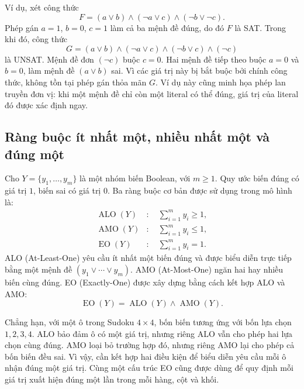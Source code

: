 \documentclass[a4paper,fleqn]{cas-sc}
\begin{document}
Ví dụ, xét công thức
\begin{equation}
 F=(a\lor b)\land(\neg a\lor c)\land(\neg b\lor\neg c).
 \label{eq:theory-sat-example}
\end{equation}
Phép gán $a=1$, $b=0$, $c=1$ làm cả ba mệnh đề đúng, do đó $F$ là SAT.
Trong khi đó, công thức
\begin{equation}
 G=(a\lor b)\land(\neg a\lor c)
   \land(\neg b\lor c)\land(\neg c)
 \label{eq:theory-unsat-example}
\end{equation}
là UNSAT. Mệnh đề đơn $(\neg c)$ buộc $c=0$. Hai mệnh đề tiếp theo
buộc $a=0$ và $b=0$, làm mệnh đề $(a\lor b)$ sai. Vì các giá trị này bị
bắt buộc bởi chính công thức, không tồn tại phép gán thỏa mãn $G$.
Ví dụ này cũng minh họa phép lan truyền đơn vị: khi một mệnh đề chỉ còn
một literal có thể đúng, giá trị của literal đó được xác định ngay.

\subsection{Ràng buộc ít nhất một, nhiều nhất một và đúng một}

Cho $Y=\{y_1,\ldots,y_m\}$ là một nhóm biến Boolean, với $m\geq 1$.
Quy ước biến đúng có giá trị $1$, biến sai có giá trị $0$. Ba ràng buộc
cơ bản được sử dụng trong mô hình là:
\begin{align}
 \operatorname{ALO}(Y)&:\quad \sum_{i=1}^{m}y_i\geq 1,
 \label{eq:theory-alo}\\
 \operatorname{AMO}(Y)&:\quad \sum_{i=1}^{m}y_i\leq 1,
 \label{eq:theory-amo}\\
 \operatorname{EO}(Y)&:\quad \sum_{i=1}^{m}y_i=1.
 \label{eq:theory-eo}
\end{align}
ALO (At-Least-One) yêu cầu ít nhất một biến đúng và được biểu diễn trực
tiếp bằng một mệnh đề $(y_1\lor\cdots\lor y_m)$. AMO (At-Most-One)
ngăn hai hay nhiều biến cùng đúng. EO (Exactly-One) được xây dựng bằng
cách kết hợp ALO và AMO:
\begin{equation}
 \operatorname{EO}(Y)=\operatorname{ALO}(Y)\land\operatorname{AMO}(Y).
 \label{eq:theory-eo-decomposition}
\end{equation}

Chẳng hạn, với một ô trong Sudoku $4\times4$, bốn biến tương ứng với
bốn lựa chọn $1,2,3,4$. ALO bảo đảm ô có một giá trị, nhưng riêng ALO vẫn
cho phép hai lựa chọn cùng đúng. AMO loại bỏ trường hợp đó, nhưng riêng
AMO lại cho phép cả bốn biến đều sai. Vì vậy, cần kết hợp hai điều kiện
để biểu diễn yêu cầu mỗi ô nhận đúng một giá trị. Cùng một cấu trúc EO
cũng được dùng để quy định mỗi giá trị xuất hiện đúng một lần trong
mỗi hàng, cột và khối.
\end{document}
